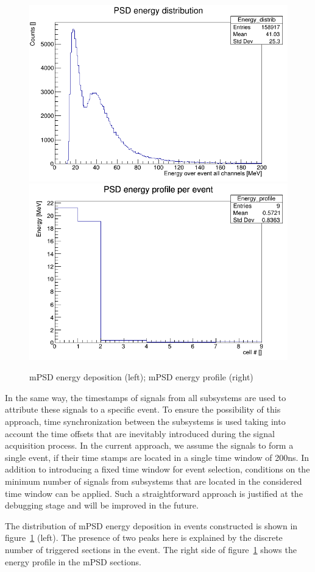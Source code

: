 \documentclass[a4paper,11pt]{article}
\begin{document}
\begin{figure}[htbp]
\centering %
\includegraphics[width=.4\textwidth]{PsdEdepInEvent_calibrd.png}
\qquad
\includegraphics[width=.4\textwidth]{PsdEprofileInEvent_calibrd.png}
\caption{\label{fig:7} mPSD energy deposition (left); mPSD energy profile (right)}
\end{figure}

In the same way, the timestamps of signals from all subsystems are used to attribute these signals to a specific event. To ensure the possibility of this approach, time synchronization between the subsystems is used taking into account the time offsets that are inevitably introduced during the signal acquisition process. In the current approach, we assume the signals to form a single event, if their time stamps are located in a single time window of 200ns. In addition to introducing a fixed time window for event selection, conditions on the minimum number of signals from subsystems that are located in the considered time window can be applied. Such a straightforward approach is justified at the debugging stage and will be improved in the future.

The distribution of mPSD energy deposition in events constructed is shown in figure~\ref{fig:7} (left). The presence of two peaks here is explained by the discrete number of triggered sections in the event. The right side of figure~\ref{fig:7} shows the energy profile in the mPSD sections.
\end{document}
